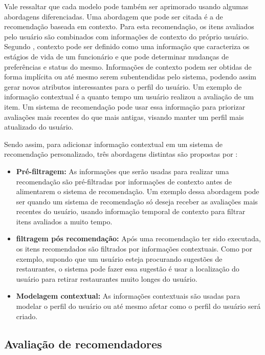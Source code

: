 Vale ressaltar que cada modelo pode também ser aprimorado usando algumas
abordagens diferenciadas. Uma abordagem que pode ser citada é a de recomendação
baseada em contexto. Para esta recomendação, os itens avaliados pelo usuário são
combinados com informações de contexto do próprio usuário. Segundo \cite{berry1997data},
contexto pode ser definido como uma informação que caracteriza os estágios de
vida de um funcionário e que pode determinar mudanças de preferências e status
do mesmo. Informações de contexto podem ser obtidas de forma implícita ou até
mesmo serem subentendidas pelo sistema, podendo assim gerar novos atributos
interessantes para o perfil do usuário. Um exemplo de informação contextual é a
quanto tempo um usuário realizou a avaliação de um item. Um sistema de
recomendação pode usar essa informação para priorizar avaliações mais recentes
do que mais antigas, visando manter um perfil mais atualizado do usuário.

Sendo assim, para adicionar informação contextual em um sistema de recomendação
personalizado, três abordagens distintas são propostas por
\cite{adomavicius2011context}:

\begin{itemize}
    \item \textbf{Pré-filtragem: } As informações que serão usadas
        para realizar uma recomendação são pré-filtradas por informações de
        contexto antes de alimentarem o sistema de recomendação. Um exemplo
        dessa abordagem pode ser quando um sistema de recomendação só deseja
        receber as avaliações mais recentes do usuário, usando informação
        temporal de contexto para filtrar itens avaliados a muito tempo.
    \item \textbf{filtragem pós recomendação: } Após uma recomendação ter sido
        executada, os itens recomendados são filtrados por informações
        contextuais. Como por exemplo, supondo que um usuário esteja procurando
        sugestões de restaurantes, o sistema pode fazer essa sugestão é usar a
        localização do usuário para retirar restaurantes muito longes do
        usuário.
    \item \textbf{Modelagem contextual: } As informações contextuais são usadas
        para modelar o perfil do usuário ou até mesmo afetar como o perfil do
        usuário será criado.
\end{itemize}

\subsection{Avaliação de recomendadores}

